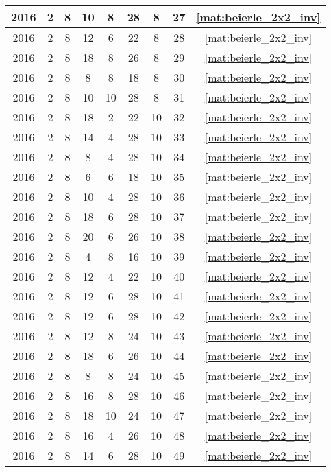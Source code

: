 \begin{longtable}{|c|c|c|c|c|c|c|c|c|}
2016 & 2 & 8 & 10 & 8 & 28 & 8 & 27 & \eqref{mat:beierle_2x2_inv} \\ \hline 
2016 & 2 & 8 & 12 & 6 & 22 & 8 & 28 & \eqref{mat:beierle_2x2_inv} \\ \hline 
2016 & 2 & 8 & 18 & 8 & 26 & 8 & 29 & \eqref{mat:beierle_2x2_inv} \\ \hline 
2016 & 2 & 8 & 8 & 8 & 18 & 8 & 30 & \eqref{mat:beierle_2x2_inv} \\ \hline 
2016 & 2 & 8 & 10 & 10 & 28 & 8 & 31 & \eqref{mat:beierle_2x2_inv} \\ \hline 
2016 & 2 & 8 & 18 & 2 & 22 & 10 & 32 & \eqref{mat:beierle_2x2_inv} \\ \hline 
2016 & 2 & 8 & 14 & 4 & 28 & 10 & 33 & \eqref{mat:beierle_2x2_inv} \\ \hline 
2016 & 2 & 8 & 8 & 4 & 28 & 10 & 34 & \eqref{mat:beierle_2x2_inv} \\ \hline 
2016 & 2 & 8 & 6 & 6 & 18 & 10 & 35 & \eqref{mat:beierle_2x2_inv} \\ \hline 
2016 & 2 & 8 & 10 & 4 & 28 & 10 & 36 & \eqref{mat:beierle_2x2_inv} \\ \hline 
2016 & 2 & 8 & 18 & 6 & 28 & 10 & 37 & \eqref{mat:beierle_2x2_inv} \\ \hline 
2016 & 2 & 8 & 20 & 6 & 26 & 10 & 38 & \eqref{mat:beierle_2x2_inv} \\ \hline 
2016 & 2 & 8 & 4 & 8 & 16 & 10 & 39 & \eqref{mat:beierle_2x2_inv} \\ \hline 
2016 & 2 & 8 & 12 & 4 & 22 & 10 & 40 & \eqref{mat:beierle_2x2_inv} \\ \hline 
2016 & 2 & 8 & 12 & 6 & 28 & 10 & 41 & \eqref{mat:beierle_2x2_inv} \\ \hline 
2016 & 2 & 8 & 12 & 6 & 28 & 10 & 42 & \eqref{mat:beierle_2x2_inv} \\ \hline 
2016 & 2 & 8 & 12 & 8 & 24 & 10 & 43 & \eqref{mat:beierle_2x2_inv} \\ \hline 
2016 & 2 & 8 & 18 & 6 & 26 & 10 & 44 & \eqref{mat:beierle_2x2_inv} \\ \hline 
2016 & 2 & 8 & 8 & 8 & 24 & 10 & 45 & \eqref{mat:beierle_2x2_inv} \\ \hline 
2016 & 2 & 8 & 16 & 8 & 28 & 10 & 46 & \eqref{mat:beierle_2x2_inv} \\ \hline 
2016 & 2 & 8 & 18 & 10 & 24 & 10 & 47 & \eqref{mat:beierle_2x2_inv} \\ \hline 
2016 & 2 & 8 & 16 & 4 & 26 & 10 & 48 & \eqref{mat:beierle_2x2_inv} \\ \hline 
2016 & 2 & 8 & 14 & 6 & 28 & 10 & 49 & \eqref{mat:beierle_2x2_inv} \\ \hline 

\end{longtable}
